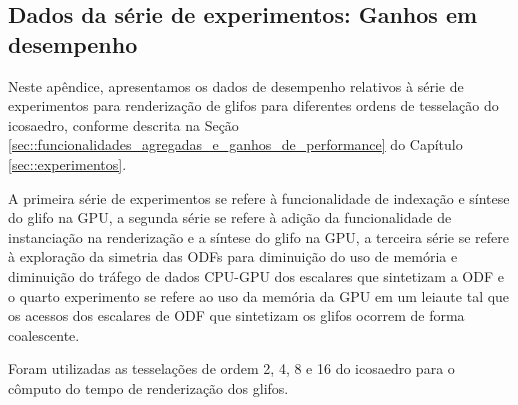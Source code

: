\documentclass[
    12pt,                %
    oneside,            %
    a4paper,            %
    english,            %
    french,                %
    spanish,            %
    brazil                %
    ]{abntex2}
\begin{document}
\begin{apendicesenv}
\chapter{Dados da série de experimentos: Ganhos em desempenho}
\label{ap::dados_serie_experimentos_1}

Neste apêndice, apresentamos os dados de desempenho relativos à série de experimentos para renderização de glifos para diferentes ordens de tesselação do icosaedro, conforme descrita na Seção \ref{sec::funcionalidades_agregadas_e_ganhos_de_performance} do Capítulo \ref{sec::experimentos}.

A primeira série de experimentos se refere à funcionalidade de indexação e síntese do glifo na GPU, a segunda série se refere à adição da funcionalidade de instanciação na renderização e a síntese do glifo na GPU, a terceira série se refere à exploração da simetria das ODFs para diminuição do uso de memória e diminuição do tráfego de dados CPU-GPU dos escalares que sintetizam a ODF e o quarto experimento se refere ao uso da memória da GPU em um leiaute tal que os acessos dos escalares de ODF que sintetizam os glifos ocorrem de forma coalescente.

Foram utilizadas as tesselações de ordem 2, 4, 8 e 16 do icosaedro para o cômputo do tempo de renderização dos glifos.


\end{apendicesenv}
\end{document}
